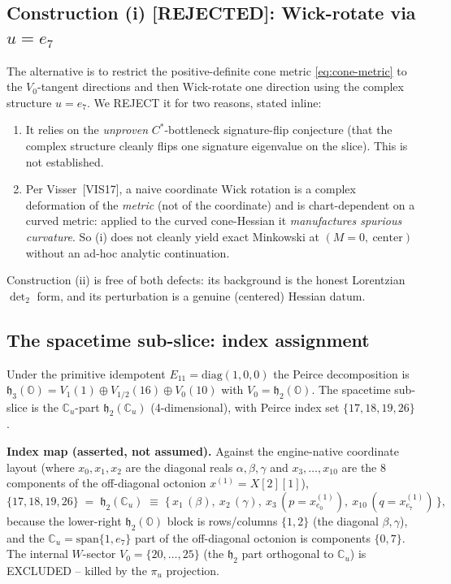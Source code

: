 \subsection{Construction (i) [REJECTED]: Wick-rotate via $u = e_7$}

The alternative is to restrict the positive-definite cone metric
\eqref{eq:cone-metric} to the $V_0$-tangent directions and then Wick-rotate one
direction using the complex structure $u = e_7$. We REJECT it for two reasons,
stated inline:
\begin{enumerate}
  \item It relies on the \emph{unproven} $C^\ast$-bottleneck signature-flip
    conjecture (that the complex structure cleanly flips one signature eigenvalue
    on the slice). This is not established.
  \item Per Visser~[VIS17], a naive coordinate Wick rotation is a complex
    deformation of the \emph{metric} (not of the coordinate) and is
    chart-dependent on a curved metric: applied to the curved cone-Hessian it
    \emph{manufactures spurious curvature}. So (i) does not cleanly yield exact
    Minkowski at $(M=0,\ \text{center})$ without an ad-hoc analytic continuation.
\end{enumerate}
Construction (ii) is free of both defects: its background is the honest Lorentzian
$\det_2$ form, and its perturbation is a genuine (centered) Hessian datum.

\subsection{The spacetime sub-slice: index assignment}
\label{sec:subslice}

Under the primitive idempotent $E_{11} = \mathrm{diag}(1,0,0)$ the Peirce
decomposition is $\mathfrak{h}_3(\mathbb{O}) = V_1(1) \oplus V_{1/2}(16) \oplus
V_0(10)$ with $V_0 = \mathfrak{h}_2(\mathbb{O})$. The spacetime sub-slice is the
$\mathbb{C}_u$-part $\mathfrak{h}_2(\mathbb{C}_u)$ (4-dimensional), with Peirce
index set $\{17,18,19,26\}$.

\medskip
\noindent\textbf{Index map (asserted, not assumed).} Against the engine-native
coordinate layout (where $x_0,x_1,x_2$ are the diagonal reals
$\alpha,\beta,\gamma$ and $x_3,\dots,x_{10}$ are the $8$ components of the
off-diagonal octonion $x^{(1)} = X[2][1]$),
\begin{equation}
  \{17,18,19,26\} \;=\; \mathfrak{h}_2(\mathbb{C}_u)
    \;\equiv\; \{\,x_1\,(\beta),\ x_2\,(\gamma),\ x_3\,(p = x^{(1)}_{e_0}),\
      x_{10}\,(q = x^{(1)}_{e_7})\,\},
  \label{eq:index-map}
\end{equation}
because the lower-right $\mathfrak{h}_2(\mathbb{O})$ block is rows/columns
$\{1,2\}$ (the diagonal $\beta,\gamma$), and the $\mathbb{C}_u = \mathrm{span}\{1,e_7\}$
part of the off-diagonal octonion is components $\{0,7\}$. The internal
$W$-sector $V_0 = \{20,\dots,25\}$ (the $\mathfrak{h}_2$ part orthogonal to
$\mathbb{C}_u$) is EXCLUDED -- killed by the $\pi_u$ projection.

